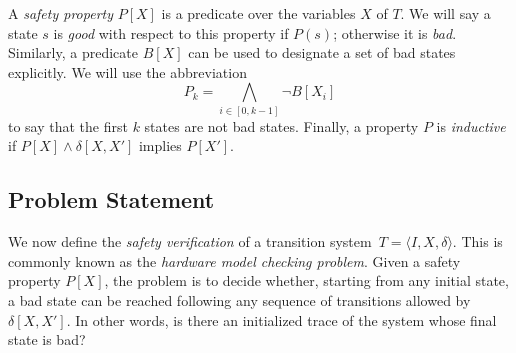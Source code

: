 A \textit{safety property} $P[X]$ is a predicate over the variables $X$ of $T$.  We will 
say a state $s$ is \textit{good} with respect to this property if $P(s)$; otherwise it is \textit{bad}. Similarly, a predicate $B[X]$ can be used to designate a set of bad states explicitly. 
We will use the abbreviation \[P_k = \underset{i \in [0,k-1]}{\bigwedge} \neg B[X_i]\]
to say that the  first $k$ states are not bad states.  Finally, a property $P$ is \textit{inductive} if $P[X] \wedge \delta[X,X']$ implies $P[X']$.    

\subsection{Problem Statement} 

We now define the \textit{safety verification} of a transition system~$T = \langle I,X,\delta\rangle$.
This is commonly known as the \textit{hardware model checking problem}.  
Given a safety property $P[X]$, the problem is to decide whether, starting from any initial state, a bad state can be reached following any sequence of transitions allowed by $\delta[X,X']$. In other words, is there an initialized trace of the system whose final state is bad?

